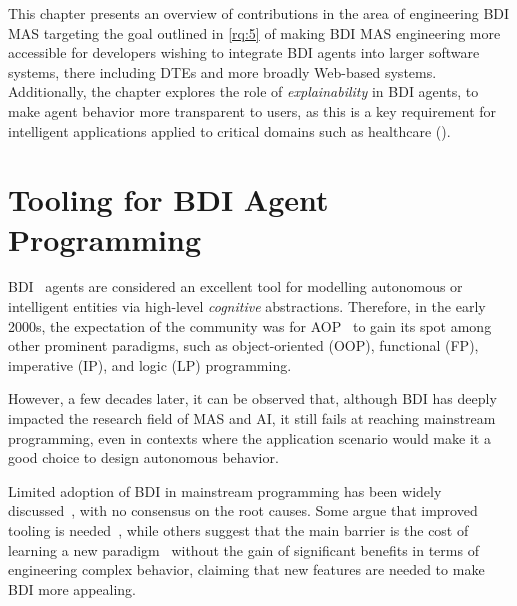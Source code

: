 This chapter presents an overview of contributions in the area of engineering \ac{BDI} \ac{MAS} targeting the goal outlined in \ref{rq:5} of making \ac{BDI} \ac{MAS} engineering more accessible for developers wishing to integrate \ac{BDI} agents into larger software systems, there including \acp{DTE} and more broadly Web-based systems.
%
Additionally, the chapter explores the role of \emph{explainability} in \ac{BDI} agents, to make agent behavior more transparent to users, as this is a key requirement for intelligent applications applied to critical domains such as healthcare ().



\section{Tooling for \acs{BDI} Agent Programming}

\ac{BDI}~\cite{rao1991modeling} agents are considered
an excellent tool for modelling autonomous or intelligent entities
via high-level \emph{cognitive} abstractions.
%
Therefore, in the early 2000s, the expectation of the community was for \ac{AOP}~\cite{Shoham_1993} to gain its spot among other prominent paradigms,
such as object-oriented (\acs{OOP}), functional (\acs{FP}), imperative (\acs{IP}), and logic (\acs{LP}) programming.

However,
a few decades later,
it can be observed that,
although \ac{BDI} has deeply impacted the research field of \ac{MAS} and \ac{AI},
it still fails at reaching mainstream programming,
even in contexts where the application scenario would make it
a good choice to design autonomous behavior.

Limited adoption of \ac{BDI} in mainstream programming has been widely discussed~\cite{lind2000aose,DBLP:journals/sigsoft/MascardiWR19,DBLP:journals/ijaose/DignumD10,DBLP:books/sp/14/Muller014,DBLP:journals/corr/abs-1209-1428}, with no consensus on the root causes.
%
Some argue that improved tooling is needed~\cite{DBLP:conf/dalt/Hindriks14},
while others suggest that the main barrier is the cost of learning a new paradigm~\cite{DBLP:journals/ijaose/Logan18} without the gain of significant benefits in terms of engineering complex behavior, claiming that new features are needed to make \ac{BDI} more appealing.

